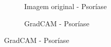 \begin{figure}[h]
  \centering
  \begin{subfigure}[b]{0.45\textwidth}
    \centering
    \caption{Imagem original - Psoríase}
    \label{fig:gradcam-original-psoriase}
  \end{subfigure}
  \hspace{0.1cm}
  \begin{subfigure}[b]{0.45\textwidth}
    \centering
    \caption{GradCAM - Psoríase}
    \label{fig:gradcam-heatmap-psoriase}
  \end{subfigure}
  

\end{figure}
